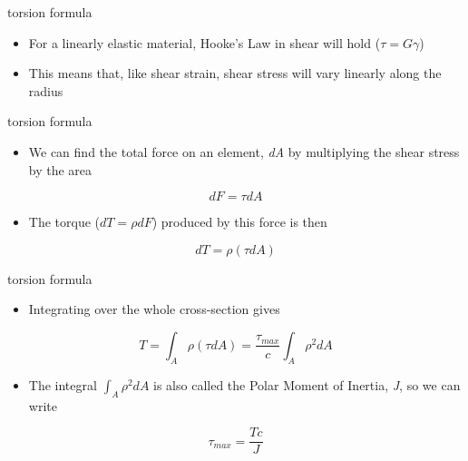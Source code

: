 \documentclass[
  letterpaper,
  ignorenonframetext,
  aspectratio=43,
  handout,
  12pt]{beamer}
\providecommand{\tightlist}{%
  \setlength{\itemsep}{0pt}\setlength{\parskip}{0pt}}
\providecommand{\tightlist}{%
\setlength{\itemsep}{0pt}\setlength{\parskip}{0pt}}
\begin{document}
\begin{frame}{torsion formula}
\protect\hypertarget{torsion-formula}{}
\begin{itemize}
\tightlist
\item
  For a linearly elastic material, Hooke's Law in shear will hold
  (\(\tau = G \gamma\))
\item
  This means that, like shear strain, shear stress will vary linearly
  along the radius
\end{itemize}
\end{frame}

\begin{frame}{torsion formula}
\protect\hypertarget{torsion-formula-1}{}
\begin{itemize}
\tightlist
\item
  We can find the total force on an element, \emph{dA} by multiplying
  the shear stress by the area
\end{itemize}

\[ dF = \tau dA\]

\begin{itemize}
\tightlist
\item
  The torque (\(dT = \rho dF\)) produced by this force is then
\end{itemize}

\[dT = \rho(\tau dA)\]
\end{frame}

\begin{frame}{torsion formula}
\protect\hypertarget{torsion-formula-2}{}
\begin{itemize}
\tightlist
\item
  Integrating over the whole cross-section gives
\end{itemize}

\[T = \int_A \rho (\tau dA) = \frac{\tau_{max}}{c} \int_A \rho^2 dA\]

\begin{itemize}
\tightlist
\item
  The integral \(\int_A \rho^2 dA\) is also called the Polar Moment of
  Inertia, \emph{J}, so we can write
\end{itemize}

\[\tau_{max} = \frac{Tc}{J}\]
\end{frame}
\end{document}
